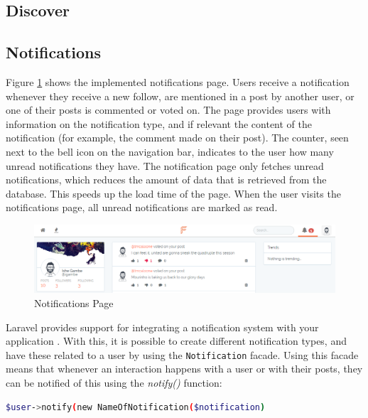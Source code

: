 \subsection{Discover}
\subsection{Notifications}
Figure \ref{fig:NotificationsPage} shows the implemented notifications page. Users receive a notification whenever they receive a new follow, are mentioned in a post by another user, or one of their posts is commented or voted on. The page provides users with information on the notification type, and if relevant the content of the notification (for example, the comment made on their post). The counter, seen next to the bell icon on the navigation bar, indicates to the user how many unread notifications they have. The notification page only fetches unread notifications, which reduces the amount of data that is retrieved from the database. This speeds up the load time of the page. When the user visits the notifications page, all unread notifications are marked as read. 

\begin{figure}[H]
\centering
\includegraphics[width=\textwidth]{Images/Implementation/NotificationsPage}
\caption{Notifications Page}
\label{fig:NotificationsPage}
\end{figure}

Laravel provides support for integrating a notification system with your application \cite{Laravel:Notifications}. With this, it is possible to create different notification types, and have these related to a user by using the \texttt{Notification} facade. Using this facade means that whenever an interaction happens with a user or with their posts, they can be notified of this using the \textit{notify()} function:

\begin{lstlisting}[language=bash]
	$user->notify(new NameOfNotification($notification)
\end{lstlisting}

